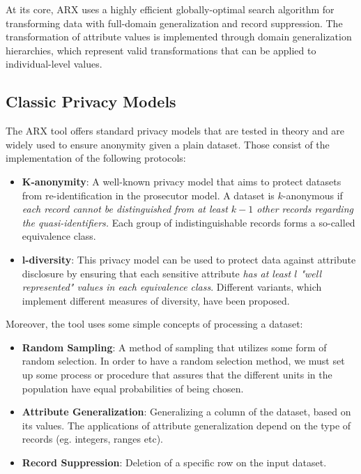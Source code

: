 At its core, ARX uses a highly efficient globally-optimal search algorithm for transforming data with full-domain generalization and record suppression. The transformation of attribute values is implemented through domain generalization hierarchies, which represent valid transformations that can be applied to individual-level values.

\subsection{Classic Privacy Models}

The ARX tool offers standard privacy models that are tested in theory and are widely used to ensure anonymity given a plain dataset. Those consist of the implementation of the following protocols:

\begin{itemize}
    \item \textbf{K-anonymity}: A well-known privacy model that aims to protect datasets from re-identification in the prosecutor model. A dataset is $k$-anonymous if\emph{ each record cannot be distinguished from at least $k-1$ other records regarding the quasi-identifiers.} Each group of indistinguishable records forms a so-called equivalence class. 
    \item \textbf{l-diversity}: This privacy model can be used to protect data against attribute disclosure by ensuring that each sensitive attribute \emph{has at least $l$ "well represented" values in each equivalence class}. Different variants, which implement different measures of diversity, have been proposed.
\end{itemize}

Moreover, the tool uses some simple concepts of processing a dataset:

\begin{itemize}
    \item \textbf{Random Sampling}: A method of sampling that utilizes some form of random selection. In order to have a random selection method, we must set up some process or procedure that assures that the different units in the population have equal probabilities of being chosen.
    \item \textbf{Attribute Generalization}: Generalizing a column of the dataset, based on its values. The applications of attribute generalization depend on the type of records (eg. integers, ranges etc).
    \item \textbf{Record Suppression}: Deletion of a specific row on the input dataset.
\end{itemize}

